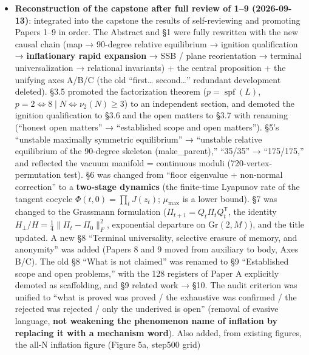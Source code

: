 \documentclass[
  a4paper,
]{ltjsarticle}
\begin{document}
\begin{itemize}
  \(2^{M-1}\). The Paper 3 citation of §3.3 was updated from
  ``\(N=3\)--\(20\) sympy'' to ``arbitrary \(N\),'' and the \(W\)
  irreducibility from ``\(N=3\)--\(40\) confirmed'' to ``proved for any
  \(N\ge3\).'' Reproduction
  \texttt{90度理論床\_整数K解析解\_全N\_20260909/parity二部構造\_解析的証明\_20260912/}.
\item
  \textbf{Reconstruction of the capstone after full review of 1--9
  (2026-09-13)}: integrated into the capstone the results of
  self-reviewing and promoting Papers 1--9 in order. The Abstract and §1
  were fully rewritten with the new causal chain (map → 90-degree
  relative equilibrium → ignition qualification → \textbf{inflationary
  rapid expansion} → SSB / plane reorientation → terminal
  universalization → relational invariants) + the central proposition +
  the unifying axes A/B/C (the old ``first\ldots{} second\ldots{}''
  redundant development deleted). §3.5 promoted the factorization
  theorem (\(p=\operatorname{spf}(L)\),
  \(p=2\iff8\mid N\iff\nu_2(N)\ge3\)) to an independent section, and
  demoted the ignition qualification to §3.6 and the open matters to
  §3.7 with renaming (``honest open matters'' → ``established scope and
  open matters''). §5's ``unstable maximally symmetric equilibrium'' →
  ``unstable relative equilibrium of the 90-degree skeleton
  (make\_parent),'' ``35/35'' → ``175/175,'' and reflected the vacuum
  manifold = continuous moduli (720-vertex-permutation test). §6 was
  changed from ``floor eigenvalue + non-normal correction'' to a
  \textbf{two-stage dynamics} (the finite-time Lyapunov rate of the
  tangent cocycle \(\Phi(t,0)=\prod_t J(z_t)\); \(\mu_{\max}\) is a
  lower bound). §7 was changed to the Grassmann formulation
  (\(\Pi_{t+1}=Q_t\Pi_tQ_t^{\mathsf T}\), the identity
  \(H_\perp/H=\tfrac14\|\Pi_t-\Pi_0\|_F^2\), exponential departure on
  \(\mathrm{Gr}(2,M)\)), and the title updated. A new §8 ``Terminal
  universality, selective erasure of memory, and anonymity'' was added
  (Papers 8 and 9 moved from auxiliary to body, Axes B/C). The old §8
  ``What is not claimed'' was renamed to §9 ``Established scope and open
  problems,'' with the 128 registers of Paper A explicitly demoted as
  scaffolding, and §9 related work → §10. The audit criterion was
  unified to ``what is proved was proved / the exhaustive was confirmed
  / the rejected was rejected / only the underived is open'' (removal of
  evasive language, \textbf{not weakening the phenomenon name of
  inflation by replacing it with a mechanism word}). Also added, from
  existing figures, the all-N inflation figure (Figure 5a, step500 grid)

\end{itemize}
\end{document}
